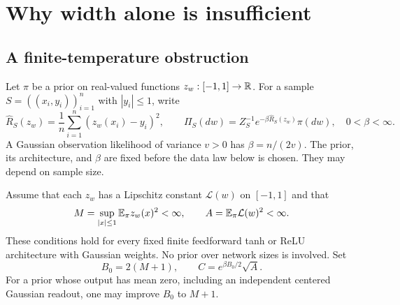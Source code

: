 \section{Why width alone is insufficient}\label{width-only:sec:width-only-obstruction}\subsection{A finite-temperature obstruction}
Let $\pi$ be a prior on real-valued functions $z_w:[-1,1]\to\mathbb R$. For a sample $S=((x_i,y_i))_{i=1}^n$ with $|y_i|\le1$, write
\[
 \widehat R_S(z_w)=\frac1n\sum_{i=1}^n(z_w(x_i)-y_i)^2,
 \qquad
 \Pi_S(dw)=Z_S^{-1}e^{-\beta\widehat R_S(z_w)}\pi(dw),
 \quad 0<\beta<\infty.
\]
A Gaussian observation likelihood of variance $v>0$ has $\beta=n/(2v)$. The prior, its architecture, and $\beta$ are fixed before the data law below is chosen. They may depend on sample size.

Assume that each $z_w$ has a Lipschitz constant $\mathcal L(w)$ on $[-1,1]$ and that
\begin{equation}
 M=\sup_{|x|\le1}\mathbb E_\pi z_w(x)^2<\infty,
 \qquad A=\mathbb E_\pi\mathcal L(w)^2<\infty.
 \label{width-only:eq:moments}
\end{equation}
These conditions hold for every fixed finite feedforward tanh or ReLU architecture with Gaussian weights. No prior over network sizes is involved. Set
\[
 B_0=2(M+1),\qquad C=e^{\beta B_0/2}\sqrt A.
\]
For a prior whose output has mean zero, including an independent centered Gaussian readout, one may improve $B_0$ to $M+1$.

